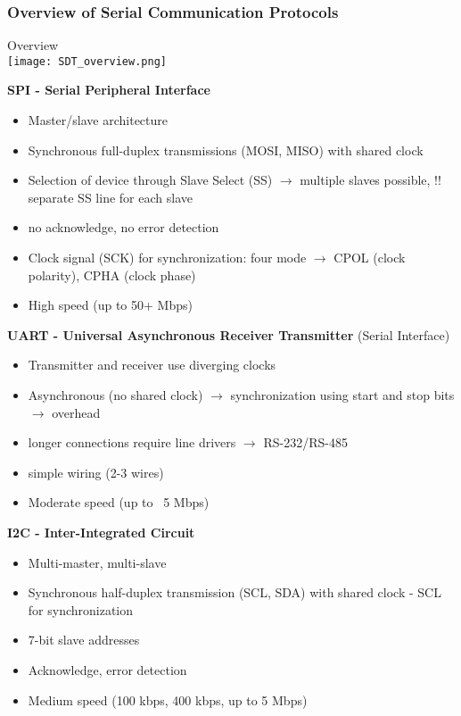 \multend

\subsubsection{Overview of Serial Communication Protocols}

\begin{concept}{Overview}\\
    \texttt{[image: SDT\_overview.png]}

    \textbf{SPI - Serial Peripheral Interface}
    \begin{itemize}
        \item Master/slave architecture
        \item Synchronous full-duplex transmissions (MOSI, MISO) with shared clock
        \item Selection of device through Slave Select (SS) $\rightarrow$ multiple slaves possible, !! separate SS line for each slave
        \item no acknowledge, no error detection
        \item Clock signal (SCK) for synchronization: four mode $\rightarrow$ CPOL (clock polarity), CPHA (clock phase)
        \item High speed (up to 50+ Mbps)
    \end{itemize}
    \vspace{2mm}

    \textbf{UART - Universal Asynchronous Receiver Transmitter} (Serial Interface)
    \begin{itemize}
        \item Transmitter and receiver use diverging clocks
        \item Asynchronous (no shared clock) $\rightarrow$ synchronization using start and stop bits $\rightarrow$ overhead
        \item longer connections require line drivers $\rightarrow$ RS-232/RS-485
        \item simple wiring (2-3 wires)
        \item Moderate speed (up to ~5 Mbps)
    \end{itemize}
    \vspace{2mm}

    \textbf{I2C - Inter-Integrated Circuit}
    \begin{itemize}
        \item Multi-master, multi-slave
        \item Synchronous half-duplex transmission (SCL, SDA) with shared clock - SCL for synchronization
        \item 7-bit slave addresses
        \item Acknowledge, error detection
        \item Medium speed (100 kbps, 400 kbps, up to 5 Mbps)
    \end{itemize}
\end{concept}

